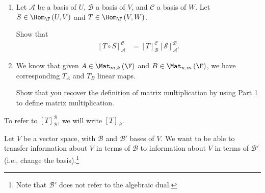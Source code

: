 \documentclass[10pt]{mypackage}
\begin{document}
\begin{exercise}
  \begin{enumerate}[(1)]
    \item Let $\mathcal{A}$ be a basis of $U$, $\mathcal{B}$ a basis of $V$, and $\mathcal{C}$ a basis of $W$. Let $S\in\Hom_{\F}\left(U,V\right)$ and $T\in\Hom_{\F}\left(V,W\right)$.\newline

  Show that
  \begin{align*}
    \left[T\circ S\right]_{\mathcal{A}}^{\mathcal{C}} &= \left[T\right]_{\mathcal{B}}^{\mathcal{C}}\left[\mathcal{S}\right]_{\mathcal{A}}^{\mathcal{B}}.
  \end{align*}
  \item We know that given $A\in \Mat_{m,k}\left(\F\right)$ and $B\in \Mat_{n,m}\left(\F\right)$, we have corresponding $T_A$ and $T_B$ linear maps.\newline

  Show that you recover the definition of matrix multiplication by using Part 1 to define matrix multiplication.
  \end{enumerate}
  \end{exercise}
  \begin{note}
    To refer to $\left[T\right]_{\mathcal{B}}^{\mathcal{B}}$, we will write $\left[T\right]_{\mathcal{B}}$.
  \end{note}
  Let $V$ be a vector space, with $\mathcal{B}$ and $\mathcal{B}'$ bases of $V$. We want to be able to transfer information about $V$ in terms of $\mathcal{B}$ to information about $V$ in terms of $\mathcal{B}'$ (i.e., change the basis).\footnote{Note that $\mathcal{B}'$ does not refer to the algebraic dual.}\newline
\end{document}
